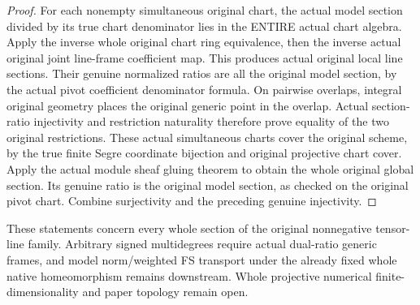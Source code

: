 \begin{proof}
For each nonempty simultaneous original chart, the actual model section divided by its true chart denominator lies in the ENTIRE actual chart algebra. Apply the inverse whole original chart ring equivalence, then the inverse actual original joint line-frame coefficient map. This produces actual original local line sections. Their genuine normalized ratios are all the original model section, by the actual pivot coefficient denominator formula. On pairwise overlaps, integral original geometry places the original generic point in the overlap. Actual section-ratio injectivity and restriction naturality therefore prove equality of the two original restrictions. These actual simultaneous charts cover the original scheme, by the true finite Segre coordinate bijection and original projective chart cover. Apply the actual module sheaf gluing theorem to obtain the whole original global section. Its genuine ratio is the original model section, as checked on the original pivot chart. Combine surjectivity and the preceding genuine injectivity.
\end{proof}
These statements concern every whole section of the original nonnegative tensor-line family. Arbitrary signed multidegrees require actual dual-ratio generic frames, and model norm/weighted FS transport under the already fixed whole native homeomorphism remains downstream. Whole projective numerical finite-dimensionality and paper topology remain open.
